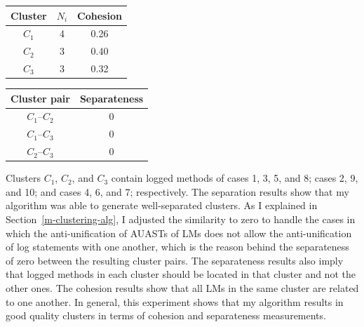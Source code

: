 
\begin{table}[t]
\centering\begin{minipage}[b]{.40\textwidth}
   \centering
   \begin{tabular}{ ccc}\toprule
     {Cluster}&{$N_i$}&{Cohesion}\\
    \toprule
    $C_1$&4& 0.26 \\
    \midrule
    $C_2$&3& 0.40\\
    \midrule
    $C_3$&3& 0.32\\
 	\bottomrule
   \end{tabular}
   \label{tab:cohesion}
\end{minipage}\qquad
\begin{minipage}[b]{.40\textwidth}
   \centering
   \begin{tabular}{ cc}\toprule
     {Cluster pair}&{Separateness}\\
    \toprule
    $C_1$--$C_2$& 0\\
    \midrule
    $C_1$--$C_3$& 0\\
    \midrule
    $C_2$--$C_3$& 0\\
 	\bottomrule
   \end{tabular}
   \label{tab:separateness}

\end{minipage}
\end{table}


Clusters $C_1$, $C_2$, and $C_3$ contain logged methods of cases 1, 3, 5, and 8; cases 2, 9, and 10; and cases 4, 6, and 7; respectively.
The separation results show that my algorithm was able to generate well-separated clusters.
As I explained in Section~\ref{m-clustering-alg}, I adjusted the similarity to zero to handle the cases in which the anti-unification of AUASTs of LMs does not allow the anti-unification of log statements with one another, which is the reason behind the separateness of zero between the resulting cluster pairs. The separateness results also imply that logged methods in each cluster should be located in that cluster and not the other ones. The cohesion results show that all LMs in the same cluster are related to one another. In general, this experiment shows that my algorithm results in good quality clusters in terms of cohesion and separateness measurements.


